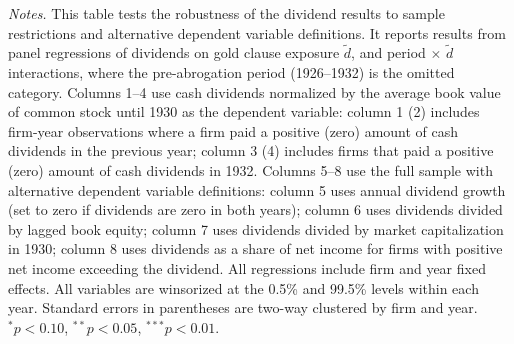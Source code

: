 \begin{landscape}
\begin{table}[p]
\vspace*{3mm} \justifying \noindent
\scriptsize{\textit{Notes.} This table tests the robustness of the dividend results to sample restrictions and alternative dependent variable definitions. It reports results from panel regressions of dividends on gold clause exposure $\tilde{d}$, and period $\times$ $\tilde{d}$ interactions, where the pre-abrogation period (1926--1932) is the omitted category. Columns 1--4 use cash dividends normalized by the average book value of common stock until 1930 as the dependent variable: column 1 (2) includes firm-year observations where a firm paid a positive (zero) amount of cash dividends in the previous year; column 3 (4) includes firms that paid a positive (zero) amount of cash dividends in 1932. Columns 5--8 use the full sample with alternative dependent variable definitions: column 5 uses annual dividend growth (set to zero if dividends are zero in both years); column 6 uses dividends divided by lagged book equity; column 7 uses dividends divided by market capitalization in 1930; column 8 uses dividends as a share of net income for firms with positive net income exceeding the dividend. All regressions include firm and year fixed effects. All variables are winsorized at the 0.5\% and 99.5\% levels within each year. Standard errors in parentheses are two-way clustered by firm and year. $^{*}p<0.10$, $^{**}p<0.05$, $^{***}p<0.01$.}
\end{table}
\end{landscape}
